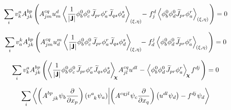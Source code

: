 \begin{equation}
   \sum_i v^a_k A^{bp}_{jk} \left(A^{cq}_{jm} u^d_m \left\langle \frac{1}{|\bm{\mathsf{J}}|} \phi^0_b \phi^0_c \mkern2mu \widetilde{J}_{pr}  \phi^r_a \mkern1mu \widetilde{J}_{qs}  \phi^s_d \right\rangle_{(\xi, \eta)} \mkern-4mu - \mkern1mu f^d_j \left\langle\phi^0_b \phi^0_d \widetilde{J}_{pr}  \phi^r_a \right\rangle_{(\xi, \eta)} \mkern2mu \right) = 0
\end{equation}

\begin{equation}
   \sum_i v^k_a A^{bp}_{jk} \left(A^{cq}_{jm} u^m_d \left\langle \frac{1}{|\bm{\mathsf{J}}|} \phi^0_b \phi^0_c \mkern2mu \widetilde{J}_{pr}  \phi^r_a \mkern1mu \widetilde{J}_{qs}  \phi^s_d \right\rangle_{\mkern-4mu(\xi, \eta)} \mkern-6mu - \mkern1mu f^j_d \left\langle\phi^0_b \phi^0_d \mkern2mu \widetilde{J}_{pr}  \phi^r_a \right\rangle_{\mkern-2mu(\xi, \eta)} \mkern2mu \right) = 0
\end{equation}

\begin{equation}
   \sum_i v^a_k A^{bp}_{jk} \left( \left\langle \frac{1}{|\bm{\mathsf{J}}|} \phi^0_b \phi^0_c \mkern2mu \widetilde{J}_{pr}  \phi^r_a \mkern1mu \widetilde{J}_{qs}  \phi^s_d \right\rangle_{\mkern-5mu\bm{\chi}} \mkern-2mu A^{cq}_{jl} u^{dl} \mkern1mu - \mkern1mu \left\langle\phi^0_b \phi^0_d \mkern2mu \widetilde{J}_{pr}  \phi^r_a \right\rangle_{\mkern-3mu\bm{\chi}} \mkern-1mu f^{dj} \mkern2mu \right) = 0
\end{equation}

\begin{equation}
   \sum_i \bra{\left(A^{bp}_{\phantom{bp}jk} \mkern1mu \psi_b \frac{\partial}{\partial x_p}\right) \left(v^a_{\phantom{a}k} \mkern1mu \psi_a\right)}\ket{\left(A^{cqjl} \mkern1mu \psi_c \frac{\partial}{\partial x_q}\right) \left(u^{dl} \mkern1mu \psi_d\right) - f^{dj} \mkern1mu \psi_d}
\end{equation}